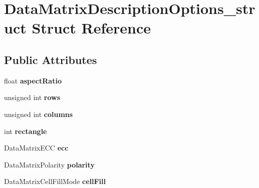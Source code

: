 \hypertarget{structDataMatrixDescriptionOptions__struct}{\section{\-Data\-Matrix\-Description\-Options\-\_\-struct \-Struct \-Reference}
\label{structDataMatrixDescriptionOptions__struct}
}
\subsection*{\-Public \-Attributes}
\begin{DoxyCompactItemize}
\item 
\hypertarget{structDataMatrixDescriptionOptions__struct_a70658854727be9580c564ab8c9844aeb}{float {\bfseries aspect\-Ratio}}\label{structDataMatrixDescriptionOptions__struct_a70658854727be9580c564ab8c9844aeb}

\item 
\hypertarget{structDataMatrixDescriptionOptions__struct_a11cccb0ff80a8c3f74ed314a2851e0cc}{unsigned int {\bfseries rows}}\label{structDataMatrixDescriptionOptions__struct_a11cccb0ff80a8c3f74ed314a2851e0cc}

\item 
\hypertarget{structDataMatrixDescriptionOptions__struct_a2ee3281044b90e2faa3caf841a821cba}{unsigned int {\bfseries columns}}\label{structDataMatrixDescriptionOptions__struct_a2ee3281044b90e2faa3caf841a821cba}

\item 
\hypertarget{structDataMatrixDescriptionOptions__struct_a686669d886d99d331cf6909372372d72}{int {\bfseries rectangle}}\label{structDataMatrixDescriptionOptions__struct_a686669d886d99d331cf6909372372d72}

\item 
\hypertarget{structDataMatrixDescriptionOptions__struct_a27cbda68c4f8f6d9be0ba437a6b47fdd}{\-Data\-Matrix\-E\-C\-C {\bfseries ecc}}\label{structDataMatrixDescriptionOptions__struct_a27cbda68c4f8f6d9be0ba437a6b47fdd}

\item 
\hypertarget{structDataMatrixDescriptionOptions__struct_a91bdd70d8b68f76db45cfac61b256b6a}{\-Data\-Matrix\-Polarity {\bfseries polarity}}\label{structDataMatrixDescriptionOptions__struct_a91bdd70d8b68f76db45cfac61b256b6a}

\item 
\hypertarget{structDataMatrixDescriptionOptions__struct_aa77217422c077e542e99dcd3d422c9dd}{\-Data\-Matrix\-Cell\-Fill\-Mode {\bfseries cell\-Fill}}\label{structDataMatrixDescriptionOptions__struct_aa77217422c077e542e99dcd3d422c9dd}


\end{DoxyCompactItemize}
